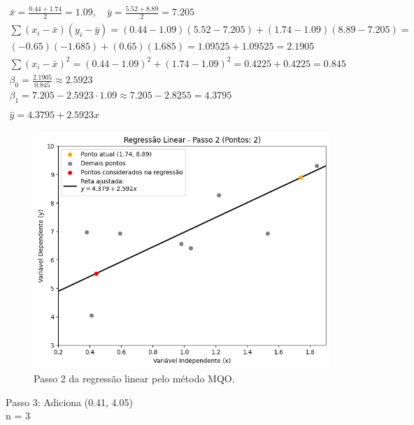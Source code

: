 \begin{gather*}
	\bar{x} = \frac{0.44 + 1.74}{2} = 1.09, \quad \bar{y} = \frac{5.52 + 8.89}{2} = 7.205 \\
	\sum (x_i - \bar{x})(y_i - \bar{y}) = (0.44 - 1.09)(5.52 - 7.205) + (1.74 - 1.09)(8.89 - 7.205) = \\ 
	(-0.65)(-1.685) + (0.65)(1.685) = 1.09525 + 1.09525 = 2.1905 \\
	\sum (x_i - \bar{x})^2 = (0.44 - 1.09)^2 + (1.74 - 1.09)^2 = 0.4225 + 0.4225 = 0.845 \\
	\beta_0 = \frac{2.1905}{0.845} \approx 2.5923\\
	\beta_1 = 7.205 - 2.5923 \cdot 1.09 \approx 7.205 - 2.8255 = 4.3795\\ \\
	\hat{y} = 4.3795 + 2.5923x
\end{gather*}

\begin{figure}[H]
	\caption{\label{fig:mqo_2}Passo 2 da regressão linear pelo método MQO.}
	\begin{center}
		\includegraphics[scale=0.5]{figuras/RL_step_2.png}
	\end{center}
\end{figure}

Passo 3: Adiciona (0.41, 4.05)
\\ n = 3

